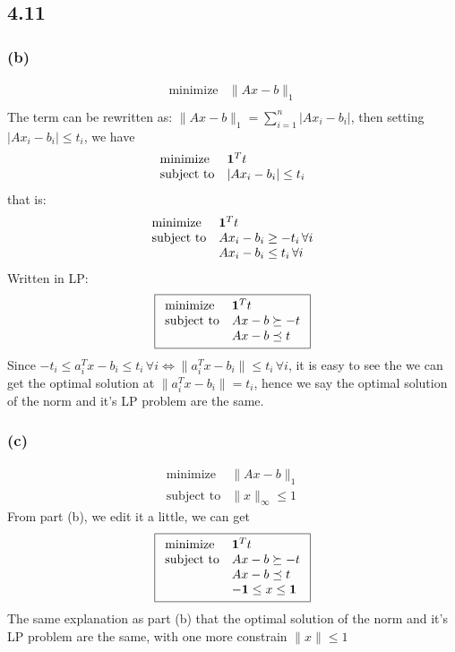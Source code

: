 \documentclass{article}
\begin{document}
    \subsection*{4.11  } 
      \subsubsection*{(b)}
      \[    \begin{array}{ll}
    \mbox{minimize}   & \|Ax - b\|_1 \\
        \end{array}
  \]    
  The term can be rewritten as: $\|Ax - b\|_1 = \sum_{i = 1}^n |Ax_i -b_i|$, then setting $ |Ax_i -b_i| \le t_i$, we have 
    \[    \begin{array}{ll}
    \mbox{minimize}   &{\bf 1}^Tt \\
        \mbox{subject to} & |Ax_i -b_i| \le t_i

        \end{array}
  \]    
  that is:
   \[    \begin{array}{ll}
    \mbox{minimize}   &{\bf 1}^Tt \\
        \mbox{subject to} & Ax_i -b_i\ge -t_i  \, \forall i\\
         & Ax_i -b_i \le t_i  \, \forall i
   \end{array}
  \]    
  Written in LP: 
     \[  \boxed{  \begin{array}{ll}
    \mbox{minimize}   &{\bf 1}^Tt \\
        \mbox{subject to} & Ax -b\succeq -t  \\\
         & Ax-b \preceq t
   \end{array} }
  \]    
  Since $-t_i \le a_i^Tx - b_i \le t_i \, \forall i  \Leftrightarrow \|a_i^Tx - b_i\| \le t_i \, \forall i $, it is easy to see the we can get the optimal solution at $\|a_i^Tx - b_i\|  = t_i$, hence we say the optimal solution of the norm and it's LP problem are the same.
    \subsubsection*{(c)}
    \[    \begin{array}{ll}
    \mbox{minimize}   & \|Ax - b\|_1 \\
    \mbox{subject to} & \|x\|_{\infty} \le 1
        \end{array}
  \]    
  From part (b), we edit it a little, we can get 
     \[  \boxed{  \begin{array}{ll}
    \mbox{minimize}   &{\bf 1}^Tt \\
        \mbox{subject to} & Ax -b\succeq -t  \\
         & Ax-b \preceq t \\
          & -{\bf 1}  \le x \le {\bf 1}
   \end{array} }
  \]    
  The same explanation as part (b) that  the optimal solution of the norm and it's LP problem are the same, with one more constrain $\|x\| \le 1$
\end{document}
